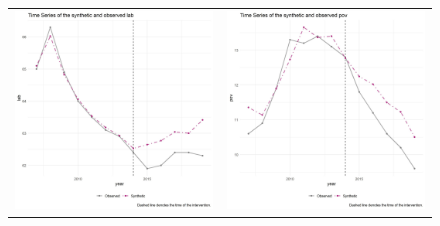 \documentclass{article}
\begin{document}
\begin{figure}
\begin{center}
\begin{tabular}{cc}
 \includegraphics[width=80mm]{nc_lab_trend} &   \includegraphics[width=80mm]{nc_pov_trend} \\
\end{tabular}
\end{center}
\label{fig:series}{}
\end{figure}

\restoregeometry

\end{document}
